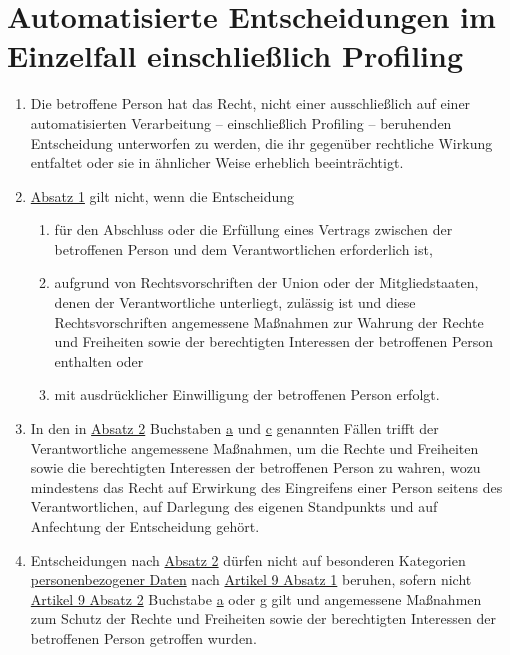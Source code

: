 \chapter{Automatisierte Entscheidungen im Einzelfall einschließlich Profiling}
\label{ch:22}


\begin{enumerate}

  \item Die betroffene Person hat das Recht, nicht einer ausschließlich auf einer automatisierten Verarbeitung --
   einschließlich Profiling -- beruhenden Entscheidung unterworfen zu werden, die ihr gegenüber rechtliche Wirkung
   entfaltet oder sie in ähnlicher Weise erheblich beeinträchtigt.
  \label{itm:22-1}

  \item \hyperref[itm:22-1]{Absatz 1} gilt nicht, wenn die Entscheidung
  \label{itm:22-2}

  \begin{enumerate}
  
    \item für den Abschluss oder die Erfüllung eines Vertrags zwischen der betroffenen Person und dem Verantwortlichen
     erforderlich ist,
    \label{itm:22-2a}

    \item aufgrund von Rechtsvorschriften der Union oder der Mitgliedstaaten, denen der Verantwortliche unterliegt,
     zulässig ist und diese Rechtsvorschriften angemessene Maßnahmen zur Wahrung der Rechte und Freiheiten sowie der
     berechtigten Interessen der betroffenen Person enthalten oder
    \label{itm:22-2b}

    \item mit ausdrücklicher Einwilligung der betroffenen Person erfolgt.
    \label{itm:22-2c}

  \end{enumerate}

  \item In den in \hyperref[itm:22-2]{Absatz 2} Buchstaben \hyperref[itm:22-2a]{a} und \hyperref[itm:22-2c]{c} genannten
   Fällen trifft der Verantwortliche angemessene Maßnahmen, um die Rechte und Freiheiten sowie die berechtigten
   Interessen der betroffenen Person zu wahren, wozu mindestens das Recht auf Erwirkung des Eingreifens einer Person
   seitens des Verantwortlichen, auf Darlegung des eigenen Standpunkts und auf Anfechtung der Entscheidung gehört.
  \label{itm:22-3}

  \item Entscheidungen nach \hyperref[itm:22-2]{Absatz 2} dürfen nicht auf besonderen Kategorien \hyperref[itm:04-1]{personenbezogener Daten}
  nach \hyperref[itm:09-1]{Artikel 9 Absatz 1} beruhen, sofern nicht \hyperref[itm:09-2]{Artikel 9 Absatz 2} Buchstabe
  \hyperref[itm:09-2a]{a} oder \hyperref[itm:09-2g]{g} gilt und angemessene Maßnahmen zum Schutz der Rechte und
   Freiheiten sowie der berechtigten Interessen der betroffenen Person getroffen wurden.
  \label{itm:22-4}

\end{enumerate}



